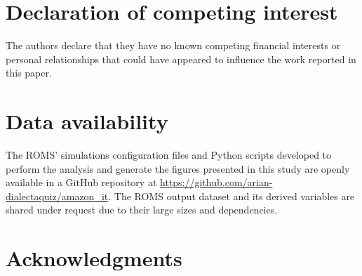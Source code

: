 \documentclass[a4paper,fleqn]{cas-sc}
\begin{document}
\section*{Declaration of competing interest}
The authors declare that they have no known competing financial interests or personal relationships that could have appeared to influence the work reported in this paper.

\section*{Data availability}
The ROMS' simulations configuration files and Python scripts developed to perform the analysis and generate the figures presented in this study are openly available in a GitHub repository at \url{https://github.com/arian-dialectaquiz/amazon_it}. The ROMS output dataset and its derived variables are shared under request due to their large sizes and dependencies. 

\section*{Acknowledgments}

%





\end{document}
